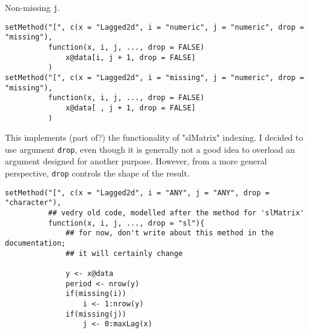 \documentclass[11pt,a4paper]{article}
\begin{document}
Non-missing \texttt{j}. 
\begin{verbatim}
setMethod("[", c(x = "Lagged2d", i = "numeric", j = "numeric", drop = "missing"),
          function(x, i, j, ..., drop = FALSE)  
              x@data[i, j + 1, drop = FALSE]
          )
setMethod("[", c(x = "Lagged2d", i = "missing", j = "numeric", drop = "missing"),
          function(x, i, j, ..., drop = FALSE)  
              x@data[ , j + 1, drop = FALSE]
          )
\end{verbatim}
This implements (part of?) the functionality of "slMatrix" indexing. I decided to 
use argument \texttt{drop}, even though it is generally not a good idea to overload an argument
designed for another purpose. However, from a more general perspective, \texttt{drop} controls the
shape of the result. 
\begin{verbatim}
setMethod("[", c(x = "Lagged2d", i = "ANY", j = "ANY", drop = "character"),
          ## vedry old code, modelled after the method for 'slMatrix'
          function(x, i, j, ..., drop = "sl"){  
              ## for now, don't write about this method in the documentation;
              ## it will certainly change

              y <- x@data
              period <- nrow(y)
              if(missing(i))
                  i <- 1:nrow(y)
              if(missing(j))
                  j <- 0:maxLag(x)


\end{verbatim}
\end{document}
